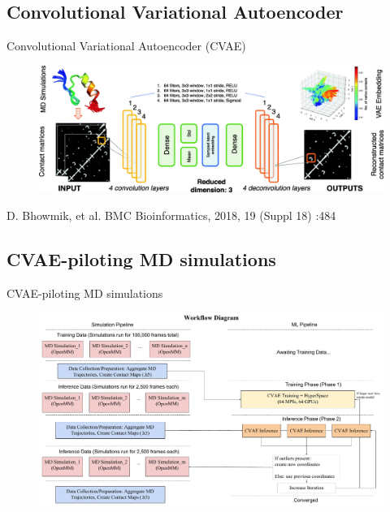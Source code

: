 \documentclass{beamer}
\begin{document}
\subsection{Convolutional Variational Autoencoder}
\begin{frame}{Convolutional Variational Autoencoder (CVAE)}
\begin{figure}
	\includegraphics[width=\linewidth]{Pics/CVAE.png} 
\end{figure} 
\vfill 
\hfill {\tiny D. Bhowmik, et al. BMC Bioinformatics, 2018, 19 (Suppl 18) :484}
\end{frame}

\subsection{CVAE-piloting MD simulations}
\begin{frame}{CVAE-piloting MD simulations }
\begin{figure}
	\includegraphics[width=\linewidth]{Pics/MicroScope_Workflow_Diagram.pdf} 
\end{figure}
\end{frame}
\end{document}

